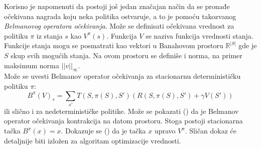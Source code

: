 \documentclass[a4paper,fleqn,12pt]{JMThesis}
\theoremstyle{plain}
\theoremstyle{definition}
\theoremstyle{definition}
\begin{document}
Korisno je napomenuti da postoji još jedan značajan način da se pronađe očekivana nagrada koju neka politika ostvaruje, a to je
pomoću takozvanog \textit{Belmanovog operatora očekivanja}. Može se definisati očekivana vrednost za politiku $\pi$ iz stanja $s$ kao
$V^{\pi}(s)$. Funkcija $V$ se naziva funkcija vrednosti stanja. Funkcije stanja mogu se posmatrati kao vektori u Banahovom prostoru
$\mathbb{R}^{|S|}$ gde je $S$ skup svih mogućih stanja. Na ovom prostoru se definiše i norma, na primer maksimum norma $||v||_{\infty}$.\\
Može se uvesti Belmanov operator očekivanja za stacionarnu determinističku politiku $\pi$:
\[
	B^{\pi}(V)_s = \sum_{s'}T(S,\pi(S),S')(R(S,\pi(S),S')+\gamma V(S'))
\]
ili slično i za nedeterminističke politike. Može se pokazati (\cite{puterman2014markov}) da je Belmanov operator očekivanja kontrakcija na datom prostoru.
Stoga postoji stacionarna tačka $B^{\pi}(x) = x$. Dokazuje se (\cite{puterman2014markov}) da je tačka $x$ upravo $V^{\pi}$.
Sličan dokaz će detaljnije biti izložen za algoritam optimizacije vrednosti.
\end{document}
